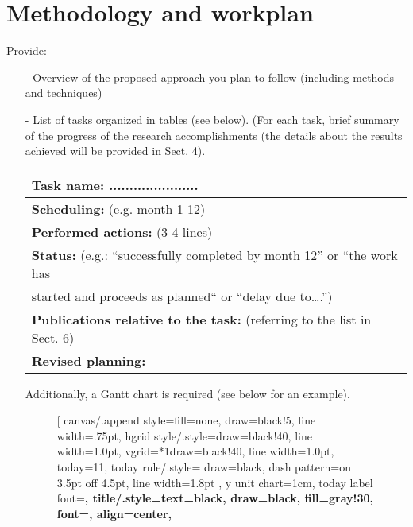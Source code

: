 \section{Methodology and workplan}

Provide: 
\begin{itemize}
	\item[-] Overview of the proposed approach you plan to follow (including methods and techniques)
	\item[-] List of tasks organized in tables (see below). (For each task, brief summary of the progress of the research accomplishments (the details about the results achieved will be provided in Sect. 4). 
	
	\begin{table}[h]
		\begin{center}
			\renewcommand{\arraystretch}{1.3} %
			\setlength{\tabcolsep}{8pt} %
			\begin{tabular}{|P{15cm}|}
				\hline
				\textbf{Task name: ......................} \\ \hline
				\textbf{Scheduling: }(e.g. month 1-12) \\ \hline
				\textbf{Performed actions: }(3-4 lines)\\
				\hline
				\textbf{Status: }(e.g.: “successfully completed by month 12” or “the work has \\ started and proceeds as planned“ or “delay due to….”)\\
				\hline
				\textbf{Publications relative to the task: } (referring to the list in Sect. 6)\\
				\hline
				\textbf{Revised planning: }\\
				\hline
			\end{tabular}
		\end{center}
	\end{table}
	Additionally, a Gantt chart is required (see below for an example).
	\begin{figure}[h]
		\begin{center}
			\begin{ganttchart}[
				canvas/.append style={fill=none, draw=black!5, line width=.75pt},
				hgrid style/.style={draw=black!40, line width=1.0pt},
				vgrid={*1{draw=black!40, line width=1.0pt}},
				today=11,
				today rule/.style={
					draw=black,
					dash pattern=on 3.5pt off 4.5pt,
					line width=1.8pt
				},
				y unit chart=1cm,
				today label font=\footnotesize\bfseries,
				title/.style={text=black, draw=black, fill=gray!30, font=\Large\bfseries, align=center},

\end{ganttchart}
\end{center}
\end{figure}
\end{itemize}
